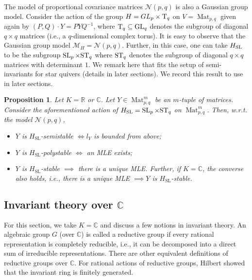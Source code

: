 \documentclass[11pt]{amsart}
\newtheorem{proposition}[theorem]{Proposition}
\theoremstyle{definition}
\newcommand{\R}{{\mathbb R}}
\newcommand{\ST}{{\rm ST}}
\newcommand{\C}{{\mathbb C}}
\newcommand{\Mat}{\operatorname{Mat}}
\newcommand{\GL}{\operatorname{GL}}
\newcommand{\SL}{\operatorname{SL}}
\begin{document}
The model of proportional covariance matrices $\mathcal{N}(p,q)$ is also a Gaussian group model. Consider the action of the group $H = GL_p \times {\rm T}_q$ on $V = \Mat_{p,q}$ given again by $(P,Q) \cdot Y = PYQ^{-1}$, where ${\rm T}_q \subseteq \GL_q$ denotes the subgroup of diagonal $q \times q$ matrices (i.e., a $q$-dimensional complex torus). It is easy to observe that the Gaussian group model $\mathcal{M}_H = \mathcal{N}(p,q)$. Further, in this case, one can take $H_{\rm SL}$ to be the subgroup $\SL_p \times \ST_q$ where $\ST_q$ denotes the subgroup of diagonal $q \times q$ matrices with determinant $1$. We remark here that fits the setup of semi-invariants for star quivers (details in later sections). We record this result to use in later sections.

\begin{proposition}  \label{AKRS-N}
Let $K = \R$ or $\C$. Let $Y \in \Mat_{p,q}^m$ be an $m$-tuple of matrices. Consider the aforementioned action of $H_{\SL} = \SL_p \times \ST_q$ on $\Mat_{p,q}^m$. Then, w.r.t. the model $\mathcal{N}(p,q)$,
\begin{itemize}
\item  $Y$ is $H_{\SL}$-semistable $\Longleftrightarrow l_Y$ is bounded from above; 
\item $Y$ is $H_{\SL}$-polystable $\Longleftrightarrow$ an MLE exists;
\item $Y$ is $H_{\SL}$-stable $\implies$ there is a unique MLE. Further, if $K = \C$, the converse also holds, i.e., there is a unique MLE $\implies Y$ is $H_{\SL}$-stable.
\end{itemize}
\end{proposition}




\subsection{Invariant theory over $\C$}
For this section, we take $K = \C$ and discuss a few notions in invariant theory. An algebraic group $G$ (over $\C$) is called a reductive group if every rational representation is completely reducible, i.e., it can be decomposed into a direct sum of irreducible representations. There are other equivalent definitions of reductive groups over $\C$. For rational actions of reductive groups, Hilbert \cite{Hilbert1,Hilbert2} showed that the invariant ring is finitely generated. %
 
\end{document}
